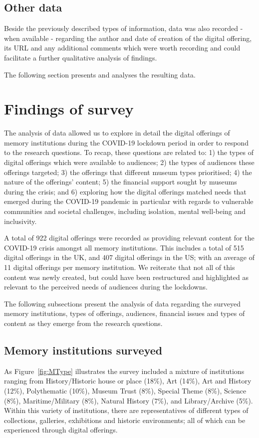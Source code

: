 \documentclass{egpubl}
\begin{document}
\subsection{Other data}
\label{other}

Beside the previously described types of information, data was also recorded - when available - regarding the author and date of creation of the digital offering, its URL and any additional comments which were worth recording and could facilitate a further qualitative analysis of findings.


The following section presents and analyses the resulting data. 
 

\section{Findings of survey}
\label{find}
The analysis of data allowed us to explore in detail the digital offerings of memory institutions during the COVID-19 lockdown period in order to respond to the research questions. To recap, these questions are related to: 1) the types of digital offerings which were available to audiences; 2) the types of audiences these offerings targeted; 3) the offerings that different museum types prioritised; 4) the nature of the offerings' content; 5) the financial support sought by museums during the crisis; and 6) exploring how the digital offerings matched needs that emerged during the COVID-19 pandemic in particular with regards to vulnerable communities and societal challenges, including isolation, mental well-being and inclusivity. 

A total of 922 digital offerings were recorded as providing relevant content for the COVID-19 crisis amongst all memory institutions. This includes a total of 515 digital offerings in the UK, and 407 digital offerings in the US; with an average of 11 digital offerings per memory institution. We reiterate that not all of this content was newly created, but could have been restructured and highlighted as relevant to the perceived needs of audiences during the lockdowns. 

The following subsections present the analysis of data regarding the surveyed memory institutions, types of offerings, audiences, financial issues and types of content as they emerge from the research questions.

\subsection{Memory institutions surveyed}
\label{inst}
As Figure~\ref{fig:MType} illustrates the survey included a mixture of institutions ranging from History/Historic house or place (18\%), Art (14\%), Art and History (12\%), Polythematic (10\%), Museum Trust (8\%), Special Theme (8\%), Science (8\%), Maritime/Military (8\%), Natural History (7\%), and Library/Archive (5\%). Within this variety of institutions, there are representatives of different types of collections, galleries, exhibitions and historic environments; all of which can be experienced through digital offerings. 
\end{document}
